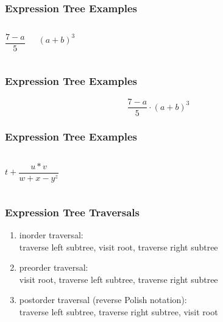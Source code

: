 \documentclass[dvipsnames]{beamer}
\begin{document}
\begin{frame}
  \frametitle{Expression Tree Examples}

  \vspace{-24pt}
  \begin{columns}[t]
    \begin{center}
      \[ \frac{7-a}{5} \]

      \medskip
    \end{center}

    \begin{center}
      \[ (a+b)^3 \]

      \medskip
    \end{center}
  \end{columns}
\end{frame}

\begin{frame}
  \frametitle{Expression Tree Examples}

  \vspace{-24pt}
  \begin{center}
    \[ \frac{7-a}{5} \cdot (a+b)^3 \]

    \medskip
  \end{center}
\end{frame}

\begin{frame}
  \frametitle{Expression Tree Examples}

  \begin{columns}
    \[ t + \frac{u*v}{w+x-y^z} \]

  \end{columns}
\end{frame}

\begin{frame}
  \frametitle{Expression Tree Traversals}

  \begin{enumerate}
    \item \alert{inorder} traversal:\\
      traverse left subtree, visit root, traverse right subtree

    \pause
    \medskip
    \item \alert{preorder} traversal:\\
      visit root, traverse left subtree, traverse right subtree

    \pause
    \medskip
    \item \alert{postorder} traversal (reverse Polish notation):\\
      traverse left subtree, traverse right subtree, visit root
  \end{enumerate}
\end{frame}
\end{document}
